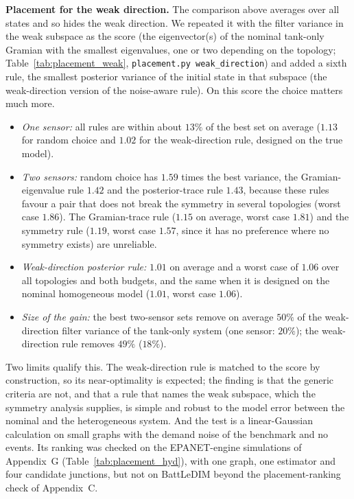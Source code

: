 \documentclass[conference]{IEEEtran}
\begin{document}
\textbf{Placement for the weak direction.} The comparison above averages over all states and so hides the weak direction. We repeated it with the filter variance in the weak subspace as the score (the eigenvector(s) of the nominal tank-only Gramian with the smallest eigenvalues, one or two depending on the topology; Table~\ref{tab:placement_weak}, \texttt{placement.py weak\_direction}) and added a sixth rule, the smallest posterior variance of the initial state in that subspace (the weak-direction version of the noise-aware rule). On this score the choice matters much more.
\begin{itemize}
\item \emph{One sensor:} all rules are within about $13\%$ of the best set on average ($1.13$ for random choice and $1.02$ for the weak-direction rule, designed on the true model).
\item \emph{Two sensors:} random choice has $1.59$ times the best variance, the Gramian-eigenvalue rule $1.42$ and the posterior-trace rule $1.43$, because these rules favour a pair that does not break the symmetry in several topologies (worst case $1.86$). The Gramian-trace rule ($1.15$ on average, worst case $1.81$) and the symmetry rule ($1.19$, worst case $1.57$, since it has no preference where no symmetry exists) are unreliable.
\item \emph{Weak-direction posterior rule:} $1.01$ on average and a worst case of $1.06$ over all topologies and both budgets, and the same when it is designed on the nominal homogeneous model ($1.01$, worst case $1.06$).
\item \emph{Size of the gain:} the best two-sensor sets remove on average $50\%$ of the weak-direction filter variance of the tank-only system (one sensor: $20\%$); the weak-direction rule removes $49\%$ ($18\%$).
\end{itemize}
Two limits qualify this. The weak-direction rule is matched to the score by construction, so its near-optimality is expected; the finding is that the generic criteria are not, and that a rule that names the weak subspace, which the symmetry analysis supplies, is simple and robust to the model error between the nominal and the heterogeneous system. And the test is a linear-Gaussian calculation on small graphs with the demand noise of the benchmark and no events. Its ranking was checked on the EPANET-engine simulations of Appendix~G (Table~\ref{tab:placement_hyd}), with one graph, one estimator and four candidate junctions, but not on BattLeDIM beyond the placement-ranking check of Appendix~C.
\end{document}
